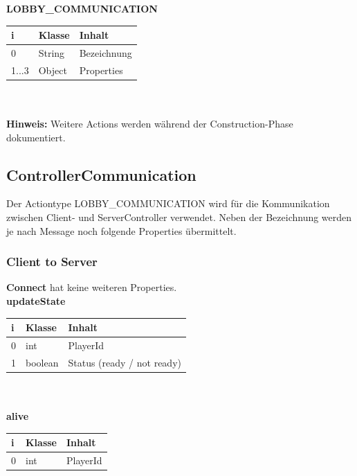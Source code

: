 \documentclass[11pt]{scrartcl}
\begin{document}
\textbf{LOBBY\_COMMUNICATION}\\

\begin{tabularx}{\linewidth}{l l l}
	\textbf{i} & \textbf{Klasse} & \textbf{Inhalt}\\
	\hline
	0 & String & Bezeichnung\\
	1...3 & Object & Properties\\
\end{tabularx}\\\\

\textbf{Hinweis: } Weitere Actions werden während der Construction-Phase dokumentiert.

\newpage

\subsection{ControllerCommunication}
Der Actiontype LOBBY\_COMMUNICATION wird für die Kommunikation zwischen Client- und ServerController verwendet. Neben der Bezeichnung werden je nach Message noch folgende Properties übermittelt.\\

\subsubsection{Client to Server}

\textbf{Connect} hat keine weiteren Properties.\\

\textbf{updateState}\\

\begin{tabularx}{\linewidth}{l l l}
	\textbf{i} & \textbf{Klasse} & \textbf{Inhalt}\\
	\hline
	0 & int & PlayerId\\
	1 & boolean & Status (ready / not ready)\\
\end{tabularx}\\\\

\textbf{alive}\\

\begin{tabularx}{\linewidth}{l l l}
	\textbf{i} & \textbf{Klasse} & \textbf{Inhalt}\\
	\hline
	0 & int & PlayerId\\
\end{tabularx}\\\\
\end{document}
